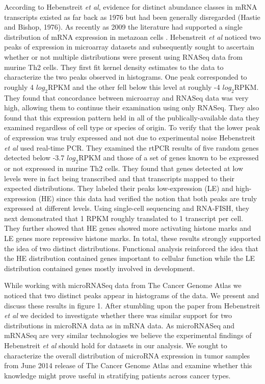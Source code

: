 \documentclass[12pt]{report}
\begin{document}
 According to Hebenstreit \emph{et al}, evidence for distinct abundance classes in mRNA transcripts existed as far back 
 as 1976 but had been generally disregarded (Hastie and Bishop, 1976). As recently as 2009 the literature 
 had supported a single distribution of mRNA expression in metazoan cells \cite{Lu2009, Ramskold2009}. 
 Hebenstreit \emph{et al} noticed two peaks of expression in microarray datasets 
 and subsequently sought to ascertain whether or not multiple distributions were 
 present using RNASeq data from murine Th2 cells. They first fit kernel density estimates to the data 
 to characterize the two peaks observed in histograms. One peak corresponded to roughly 4 $log_{2} \text{RPKM}$
 and the other fell below this level  at roughly -4 $log_{2} \text{RPKM}$. They found that concordance 
 between microarray and RNASeq data was very high, allowing them to continue 
 their examination using only RNASeq. They also found that this expression pattern held
 in all of the publically-available data they examined regardless of cell type or species of origin.
 To verify that the lower peak of expression was truly expressed and not due to 
 experimental noise Hebenstreit \emph{et al} used real-time PCR. They examined 
 the rtPCR results of five random genes detected below -3.7 $log_{2} \text{RPKM}$ 
 and those of a set of genes known to be expressed or not expressed in murine 
 Th2 cells. They found that genes detected at low levels were in fact being 
 transcribed and that transcripts mapped to their expected distributions.
  They labeled their peaks low-expression (LE) and high-expression 
 (HE) since this data had verified the notion that both peaks are truly 
 expressed at different levels. Using single-cell sequencing and RNA-FISH, they 
 next demonstrated that 1 RPKM roughly translated to 1 transcript per cell. They 
 further showed that HE genes showed more activating histone marks and LE genes 
 more repressive histone marks. In total, these results strongly supported the 
 idea of two distinct distributions. Functional analysis reinforced the idea 
 that the HE distribution contained genes important to cellular function while 
 the LE distribution contained genes mostly involved in development.
 
 While working with microRNASeq data from The Cancer Genome Atlas we noticed 
 that two distinct peaks appear in histograms of the data. We present and 
 discuss these results in figure 1. After stumbling upon the paper from Hebenstreit \emph{et al} 
we decided to investigate whether there was similar support for two 
distributions in microRNA data as in mRNA data. As microRNASeq and mRNASeq are 
very similar technologies we believe the experimental findings of Hebenstreit \emph{et al} 
should hold for datasets in our analysis. We sought to characterize the overall 
distribution of microRNA expression in tumor samples from June 2014 release of
The Cancer Genome Atlas and examine whether this knowledge might prove useful in 
stratifying patients across cancer types.
\end{document}
